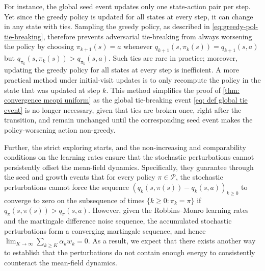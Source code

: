 For instance, the global seed event updates only one state-action pair per step. 
Yet since the greedy policy is updated for all states at every step, it can change in any state with ties.
Sampling the greedy policy, as described in \eqref{eq:greedy-pol-tie-breaking}, 
therefore prevents
adversarial tie-breaking from always worsening the policy by choosing $\pi_{k+1}(s)=a$
whenever
$q_{k+1}(s,\pi_k(s)) = q_{k+1}(s,a)$ but $q_{\pi_k}(s,\pi_k(s)) > q_{\pi_k}(s,a)$.
Such ties are rare in practice;
moreover, updating the greedy policy for all states at every step is inefficient.
A more practical method under initial-visit updates is to only recompute the policy in the state that was updated at step $k$.
This method simplifies the proof of \autoref{thm: convergence mcopi uniform} as the global tie-breaking event \eqref{eq: def global tie event} is no longer necessary,
given that ties are broken once, right after the transition, 
and remain unchanged until the corresponding seed event makes the policy-worsening action non-greedy.


Further, the strict exploring starts, and the non-increasing and comparability conditions on the learning rates ensure that the stochastic perturbations cannot persistently offset the mean-field dynamics.
Specifically, they guarantee through the seed and growth events
that
for every policy $\pi \in \mathcal P$,
the stochastic perturbations cannot force the sequence
$(q_k(s,\pi(s)) - q_k(s,a))_{k \ge 0}$ to converge to zero 
on the subsequence of times $\{k \ge 0 : \pi_k = \pi\}$
if $q_{\pi}(s,\pi(s)) > q_{\pi}(s,a)$.
However, given the Robbins--Monro learning rates and the martingale difference noise sequence,
the accumulated stochastic perturbations form a converging martingale sequence, and hence $\lim_{K \to \infty} \sum_{k \ge K} \alpha_k w_k = 0$.
As a result, we expect that there exists another way to establish that the perturbations do not contain enough energy to consistently counteract the mean-field dynamics.

